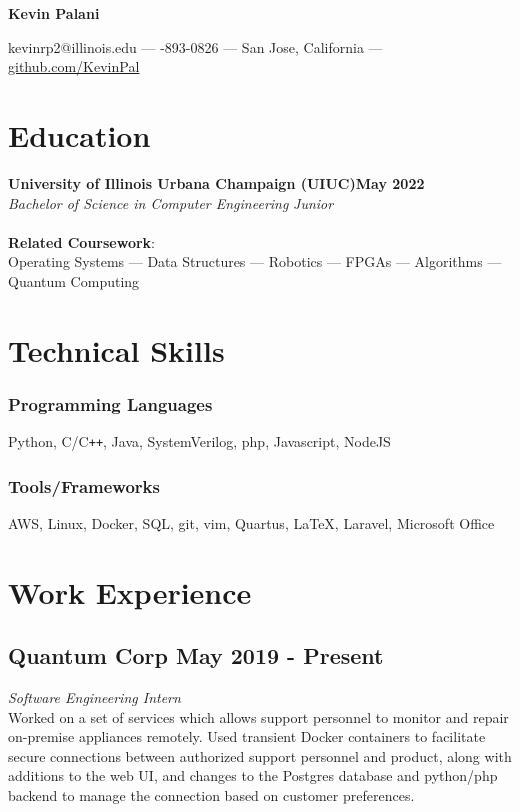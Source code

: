 \documentclass[letterpaper,11pt]{article}
\makeatletter
\newcommand\textbox[1]{%
    \parbox{.333\textwidth}{#1}%
}
\renewcommand{\maketitle}{
    \begin{center}
        \noindent\textbox{\hfill}\textbox{\hfil\bfseries\huge Kevin Palani \hfil}\vspace{3mm}\textbox{\hfill}
        {\faEnvelope \enskip kevinrp2@illinois.edu --- \faPhone \enskip 408-893-0826 --- \faHome \enskip San Jose, California --- \faGithub \enskip \underline{\href{https://github.com/KevinPal}{github.com/KevinPal}}}
    \end{center} }
\makeatother
\begin{document}
\maketitle
\section{Education}
    {\textbf{University of Illinois Urbana Champaign (UIUC)}}\null\hfill\textbf{May 2022}\\
    \emph{Bachelor of Science in Computer Engineering} \null\hfill \emph{Junior}\\
    \vspace*{-4mm}\\
    \textbf{Related Coursework}:\\ Operating Systems --- Data Structures --- Robotics --- FPGAs --- Algorithms --- Quantum Computing
\section{Technical Skills}
    \subsubsection{Programming Languages}
    Python, C/C\verb!++!, Java, SystemVerilog, php, Javascript, NodeJS
    \vspace*{-5mm}
    \subsubsection{Tools/Frameworks}
    AWS, Linux, Docker, SQL, git, vim, Quartus, \LaTeX, Laravel, Microsoft Office
    \vspace*{-5mm}
\vspace*{4mm}
\section{Work Experience}
    \subsection{Quantum Corp \null\hfill May 2019 - Present}
    \vspace*{-2mm}
    \emph{Software Engineering Intern} \null\hfill \emph{}\\
    Worked on a set of services which allows support personnel to monitor and repair on-premise appliances remotely. Used transient Docker containers to facilitate secure connections between authorized support personnel and product, along with additions to the web UI, and changes to the Postgres database and python/php backend to manage the connection based on customer preferences.
    \vspace*{-2mm}
\end{document}
